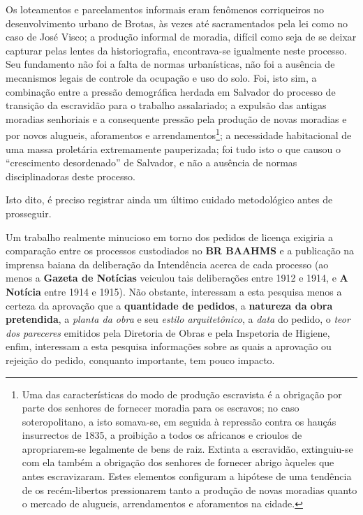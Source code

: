 Os loteamentos e parcelamentos informais eram fenômenos corriqueiros no desenvolvimento urbano de Brotas, às vezes até sacramentados pela lei como no caso de José Visco; a produção informal de moradia, difícil como seja de se deixar capturar pelas lentes da historiografia, encontrava-se igualmente neste processo. Seu fundamento não foi a falta de normas urbanísticas, não foi a ausência de mecanismos legais de controle da ocupação e uso do solo. Foi, isto sim, a combinação entre a pressão demográfica herdada em Salvador do processo de transição da escravidão para o trabalho assalariado; a expulsão das antigas moradias senhoriais e a consequente pressão pela produção de novas moradias e por novos alugueis, aforamentos e arrendamentos\footnote{Uma das características do modo de produção escravista é a obrigação por parte dos senhores de fornecer moradia para os escravos; no caso soteropolitano, a isto somava-se, em seguida à repressão contra os hauçás insurrectos de 1835, a proibição a todos os africanos e crioulos de apropriarem-se legalmente de bens de raiz. Extinta a escravidão, extinguiu-se com ela também a obrigação dos senhores de fornecer abrigo àqueles que antes escravizaram. Estes elementos configuram a hipótese de uma tendência de os recém-libertos pressionarem tanto a produção de novas moradias quanto o mercado de alugueis, arrendamentos e aforamentos na cidade.}; a necessidade habitacional de uma massa proletária extremamente pauperizada; foi tudo isto o que causou o ``crescimento desordenado'' de Salvador, e não a ausência de normas disciplinadoras deste processo.

Isto dito, é preciso registrar ainda um último cuidado metodológico antes de prosseguir. 

Um trabalho realmente minucioso em torno dos pedidos de licença exigiria a comparação entre os processos custodiados no \textbf{BR BAAHMS} e a publicação na imprensa baiana da deliberação da Intendência acerca de cada processo (ao menos a \textbf{Gazeta de Notícias} veiculou tais deliberações entre 1912 e 1914, e \textbf{A Notícia} entre 1914 e 1915). Não obstante, interessam a esta pesquisa menos a certeza da aprovação que a \textbf{quantidade de pedidos}, a \textbf{natureza da obra pretendida}, a \textit{planta da obra} e seu \textit{estilo arquitetônico}, a \textit{data} do pedido, o \textit{teor dos pareceres} emitidos pela Diretoria de Obras e pela Inspetoria de Higiene, enfim, interessam a esta pesquisa informações sobre as quais a aprovação ou rejeição do pedido, conquanto importante, tem pouco impacto.

